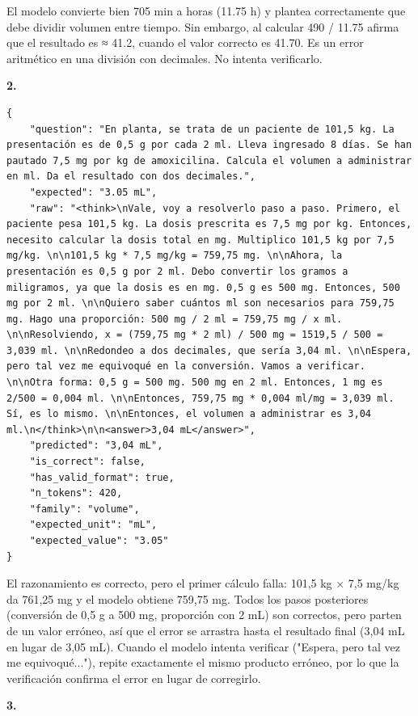El modelo convierte bien 705 min a horas (11.75 h) y plantea correctamente que debe dividir volumen entre tiempo. Sin embargo, al calcular 490 / 11.75 afirma que el resultado es ≈ 41.2, cuando el valor correcto es 41.70. Es un error aritmético en una división con decimales. No intenta verificarlo.

\textbf{2.}

\begin{lstlisting}
{
    "question": "En planta, se trata de un paciente de 101,5 kg. La presentación es de 0,5 g por cada 2 ml. Lleva ingresado 8 días. Se han pautado 7,5 mg por kg de amoxicilina. Calcula el volumen a administrar en ml. Da el resultado con dos decimales.",
    "expected": "3.05 mL",
    "raw": "<think>\nVale, voy a resolverlo paso a paso. Primero, el paciente pesa 101,5 kg. La dosis prescrita es 7,5 mg por kg. Entonces, necesito calcular la dosis total en mg. Multiplico 101,5 kg por 7,5 mg/kg. \n\n101,5 kg * 7,5 mg/kg = 759,75 mg. \n\nAhora, la presentación es 0,5 g por 2 ml. Debo convertir los gramos a miligramos, ya que la dosis es en mg. 0,5 g es 500 mg. Entonces, 500 mg por 2 ml. \n\nQuiero saber cuántos ml son necesarios para 759,75 mg. Hago una proporción: 500 mg / 2 ml = 759,75 mg / x ml. \n\nResolviendo, x = (759,75 mg * 2 ml) / 500 mg = 1519,5 / 500 = 3,039 ml. \n\nRedondeo a dos decimales, que sería 3,04 ml. \n\nEspera, pero tal vez me equivoqué en la conversión. Vamos a verificar. \n\nOtra forma: 0,5 g = 500 mg. 500 mg en 2 ml. Entonces, 1 mg es 2/500 = 0,004 ml. \n\nEntonces, 759,75 mg * 0,004 ml/mg = 3,039 ml. Sí, es lo mismo. \n\nEntonces, el volumen a administrar es 3,04 ml.\n</think>\n\n<answer>3,04 mL</answer>",
    "predicted": "3,04 mL",
    "is_correct": false,
    "has_valid_format": true,
    "n_tokens": 420,
    "family": "volume",
    "expected_unit": "mL",
    "expected_value": "3.05"
}
\end{lstlisting}

El razonamiento es correcto, pero el primer cálculo falla: 101,5 kg × 7,5 mg/kg da 761,25 mg y el modelo obtiene 759,75 mg. Todos los pasos posteriores (conversión de 0,5 g a 500 mg, proporción con 2 mL) son correctos, pero parten de un valor erróneo, así que el error se arrastra hasta el resultado final (3,04 mL en lugar de 3,05 mL). Cuando el modelo intenta verificar ("Espera, pero tal vez me equivoqué..."), repite exactamente el mismo producto erróneo, por lo que la verificación confirma el error en lugar de corregirlo.

\textbf{3.}

